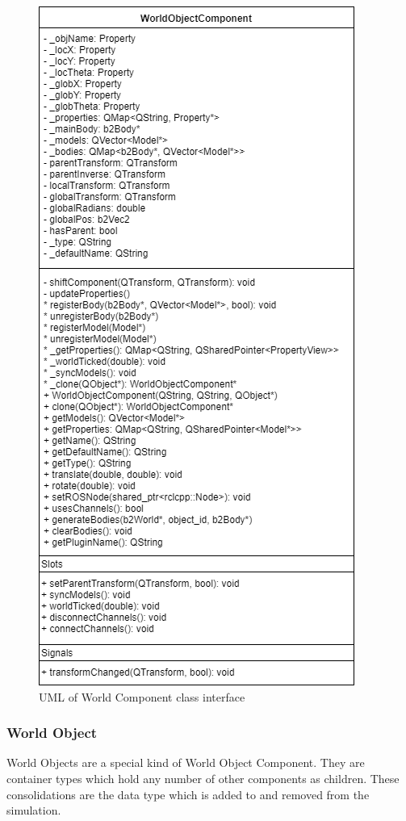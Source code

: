 	\begin{figure}
		\begin{center}
		\includegraphics[scale=0.5]{./images_design/uml/WorldComponent_If}
		\caption{UML of World Component class interface\label{uml:worldcomponent_if}}
		\end{center}
	\end{figure} 

\subsubsection*{World Object}
	World Objects are a special kind of World Object Component. They are container types which hold any number of other components as children. These consolidations are the data type which is added to and removed from the simulation.

